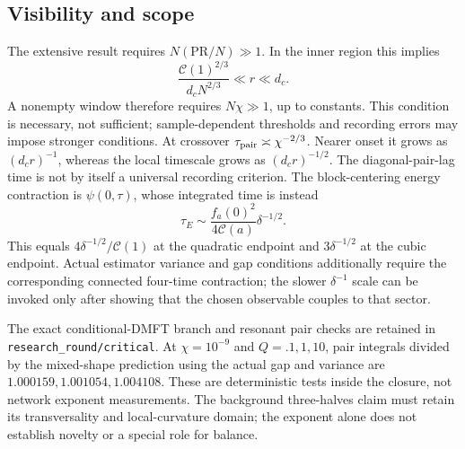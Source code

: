 \subsection{Visibility and scope}
The extensive result requires $N(\mathrm{PR}/N)\gg1$. In the inner region
this implies
\[
 \frac{\mathcal C(1)^{2/3}}{d_cN^{2/3}}\ll r\ll d_c.
\]
A nonempty window therefore requires $N\chi\gg1$, up to constants. This
condition is necessary, not sufficient; sample-dependent thresholds and
recording errors may impose stronger conditions. At crossover
$\tau_{\rm pair}\asymp\chi^{-2/3}$. Nearer onset it grows as $(d_cr)^{-1}$,
whereas the local timescale grows as $(d_cr)^{-1/2}$.
The diagonal-pair-lag time is not by itself a universal recording criterion.
The block-centering energy contraction is $\psi(0,\tau)$, whose integrated
time is instead
\[
 \tau_E\sim\frac{f_a(0)^2}{4\mathcal C(a)}\delta^{-1/2}.
\]
This equals $4\delta^{-1/2}/\mathcal C(1)$ at the quadratic endpoint and
$3\delta^{-1/2}$ at the cubic endpoint. Actual estimator variance and gap
conditions additionally require the corresponding connected four-time
contraction; the slower $\delta^{-1}$ scale can be invoked only after showing
that the chosen observable couples to that sector.

The exact conditional-DMFT branch and resonant pair checks are retained in
\texttt{research\_round/critical}. At $\chi=10^{-9}$ and $Q=.1,1,10$, pair
integrals divided by the mixed-shape prediction using the actual gap and
variance are $1.000159,1.001054,1.004108$. These are deterministic tests
inside the closure, not network exponent measurements. The background
three-halves claim must retain its transversality and local-curvature domain;
the exponent alone does not establish novelty or a special role for balance.

